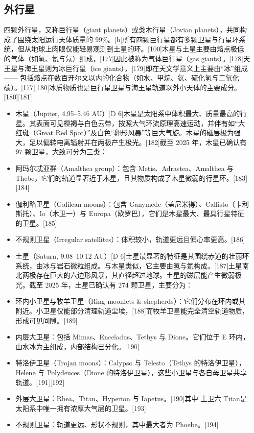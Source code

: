 \subsection{外行星}

四颗外行星，又称巨行星（giant planets）或类木行星（Jovian planets），共同构成了围绕太阳运行天体质量的 99\%。[h]所有四颗巨行星都有多颗卫星与行星环系统，但从地球上肉眼仅能轻易观测到土星的环。[100]木星与土星主要由熔点极低的气体（如氢、氦与氖）组成，[177]因此被称为气体巨行星（gas giants）。[178]天王星与海王星则为冰巨行星（ice giants），[179]即在天文学意义上主要由“冰”组成 —— 包括熔点在数百开尔文以内的化合物（如水、甲烷、氨、硫化氢与二氧化碳）。[177][180]冰质物质也是巨行星卫星与海王星轨道以外小天体的主要成分。[180][181]  


\begin{itemize}
\item 木星（Jupiter, 4.95–5.46 AU）[D 6]木星是太阳系中体积最大、质量最高的行星。其表面可见橙褐与白色云带，按照大气环流原理高速运动，并伴有如“大红斑（Great Red Spot）”及白色“卵形风暴”等巨大气旋。木星的磁层极为强大，足以偏转电离辐射并在两极产生极光。[182]截至 2025 年，木星已确认有 97 颗卫星，大致可分为三类：  
\item 阿玛尔忒亚群（Amalthea group）：包含 Metis、Adrastea、Amalthea 与 Thebe，它们的轨道显著近于木星，且其物质构成了木星微弱的行星环。[183][184]  
\item 伽利略卫星（Galilean moons）：包含 Ganymede（盖尼米得）、Callisto（卡利斯托）、Io（木卫一）与 Europa（欧罗巴），它们是木星最大、最具行星特征的卫星。[185]  
\item 不规则卫星（Irregular satellites）：体积较小，轨道更远且偏心率更高。[186]  
\end{itemize}
\begin{itemize}
\item 土星（Saturn, 9.08–10.12 AU）[D 6]土星最显著的特征是其围绕赤道的壮丽环系统，由冰与岩石微粒组成。与木星类似，它主要由氢与氦构成。[187]土星南北两极存在巨大的六边形风暴，其直径超过地球。土星的磁层能产生微弱极光。截至 2025 年，土星已确认有 274 颗卫星，主要分为：  
\item 环内小卫星与牧羊卫星（Ring moonlets & shepherds）：它们分布在环内或其附近。小卫星仅能部分清理轨道尘埃，[188]而牧羊卫星能完全清空轨道物质，形成可见间隙。[189]  
\item 内层大卫星：包括 Mimas、Enceladus、Tethys 与 Dione。它们位于 E 环内，由水冰为主组成，内部结构已分化。[190]  
\item 特洛伊卫星（Trojan moons）：Calypso 与 Telesto（Tethys 的特洛伊卫星），Helene 与 Polydeuces（Dione 的特洛伊卫星），这些小卫星与各自母卫星共享轨道。[191][192]  
\item 外层大卫星：Rhea、Titan、Hyperion 与 Iapetus。[190]其中 土卫六 Titan是太阳系中唯一拥有浓厚大气层的卫星。[193]  
\item 不规则卫星：轨道更远、形状不规则，其中最大者为 Phoebe。[194]  
\end{itemize}
